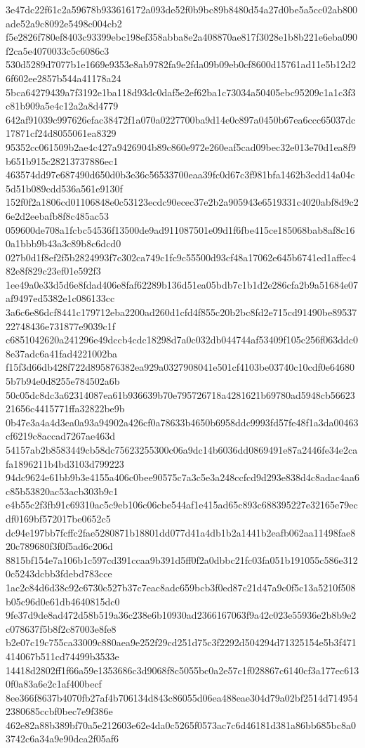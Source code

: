 {3e47dc22f61c2a59678b933616172a093de52f0b9bc89b8480d54a27d0be5a5cc02ab800ade52a9c8092e5498c004cb2
f5e2826f780ef8403c93399ebc198ef358abba8e2a408870ae817f3028e1b8b221e6eba090f2ca5e4070033c5c6086c3
530d5289d7077b1e1669e9353e8ab9782fa9e2fda09b09eb0cf8600d15761ad11e5b12d26f602ee2857b544a41178a24
5bca64279439a7f3192e1ba118d93dc0daf5e2ef62ba1c73034a50405ebc95209c1a1c3f3c81b909a5e4c12a2a8d4779
642af91039c997626efac38472f1a070a0227700ba9d14e0c897a0450b67ea6ccc65037dc17871cf24d8055061ea8329
95352cc061509b2ae4c427a9426904b89c860e972e260eaf5cad09bec32e013e70d1ea8f9b651b915c28213737886ec1
463574dd97e687490d650d0b3e36c56533700eaa39fc0d67c3f981bfa1462b3edd14a04c5d51b089cdd536a561e9130f
152f0f2a1806cd01106848e0c53123ecdc90ecec37e2b2a905943e6519331c4020abf8d9c26e2d2eebafb8f8c485ac53
059600de708a1fcbc54536f13500de9ad911087501e09d1f6fbe415ce185068bab8af8c160a1bbb9b43a3c89b8c6dcd0
027b0d1f8ef2f5b2824993f7c302ca749c1fc9c55500d93cf48a17062e645b6741ed1affec482e8f829c23ef01e592f3
1ee49a0e33d5d6e8fdad406e8faf62289b136d51ea05bdb7c1b1d2e286cfa2b9a51684e07af9497ed5382e1c086133cc
3a6c6e86dcf8441c179712eba2200ad260d1cfd4f855c20b2bc8fd2e715cd91490be8953722748436e731877e9039c1f
c6851042620a241296e49dccb4cdc18298d7a0c032db044744af53409f105c256f063ddc08e37adc6a41fad4221002ba
f15f3d66db428f722d895876382ea929a0327908041e501cf4103be03740c10cdf0e646805b7b94e0d8255e784502a6b
50c05dc8dc3a62314087ea61b936639b70e795726718a4281621b69780ad5948cb5662321656c4415771ffa32822be9b
0b47e3a4a4d3ea0a93a94902a426cf0a78633b4650b6958ddc9993fd57fe48f1a3da00463cf6219c8accad7267ae463d
54157ab2b8583449cb58dc75623255300c06a9dc14b6036dd0869491e87a2446fe34e2cafa1896211b4bd3103d799223
94dc9624e61bb9b3e4155a406c0bee90575c7a3c5e3a248ccfcd9d293e838d4c8adac4aa6c85b53820ac53acb303b9c1
e4b55c2f3fb91c69310ac5c9eb106c06cbe544af1e415ad65c893c688395227e32165e79ecdf0169bf572017be0652c5
dc94e197bb7fcffc2fae5280871b18801dd077d41a4db1b2a1441b2eafb062aa11498fae820c789680f3f0f5ad6c206d
8815bf154e7a106b1c597cd391ccaa9b391d5ff0f2a0dbbc21fc03fa051b191055c586e3120c5243dcbb3fdebd783cce
1ac2c84d6d38c92c6730c527b37c7eac8adc659bcb3f0ed87c21d47a9c0f5c13a5210f508b05c96d0e61db4640815dc0
9fe37d9de8ad472d58b519a36c238e6b10930ad2366167063f9a42c023e55936e2b8b9e2c078637f5b8f2c87003e8fe8
b2e07c19c755ca33009c880aea9e252f29cd251d75c3f2292d504294d71325154e5b3f471414067b511cd74499b3533e
14418d2802ff1f66a59e1353686c3d9068f8c5055bc0a2e57c1f028867c6140cf3a177ec6130f0a83a6e2c1af400becf
8ee366f8637b4070fb27af4b706134d843c86055d06ea488eae304d79a02bf2514d7149542380685ccbf0bec7e9f386e
462e82a88b389bf70a5e212603e62e4da0c5265f0573ac7c6d46181d381a86bb685bc8a03742c6a34a9e90dca2f05af6
}
